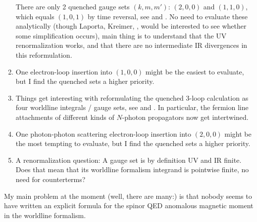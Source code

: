\begin{enumerate}
There are only 2 quenched gauge sets $(k,m,m')$:  $(2,0,0)$ and
$(1,1,0)$, which equals $(1,0,1)$ by time reversal,
see  and . No need to
evaluate these analytically (though Laporta, Kreimer, \etc,
would be interested to see whether some simplification occurs),
main thing is to understand that the UV renormalization works,
and that there are no intermediate IR divergences in this
reformulation.
  \item
One electron-loop insertion into $(1,0,0)$  might be the easiest to
evaluate, but I find the quenched sets a higher priority.
  \item
Things get interesting with reformulating the quenched 3-loop calculation
as four worldline integrals / gauge sets, see  and
. In particular, the fermion line attachments of
different kinds of $N$-photon propagators now get intertwined.
  \item
One photon-photon scattering electron-loop insertion into $(2,0,0)$ might
be the most tempting to evaluate, but I find the quenched sets a higher
priority.
  \item
A renormalization question:
A gauge set is by definition UV and IR finite. Does that mean
that its worldline formalism integrand is pointwise finite, no need for
counterterms?
    \end{enumerate}
My main problem at the moment (well, there are many:) is that nobody
seems to have written an explicit formula for the spinor QED anomalous
magnetic moment in the worldline formalism.

